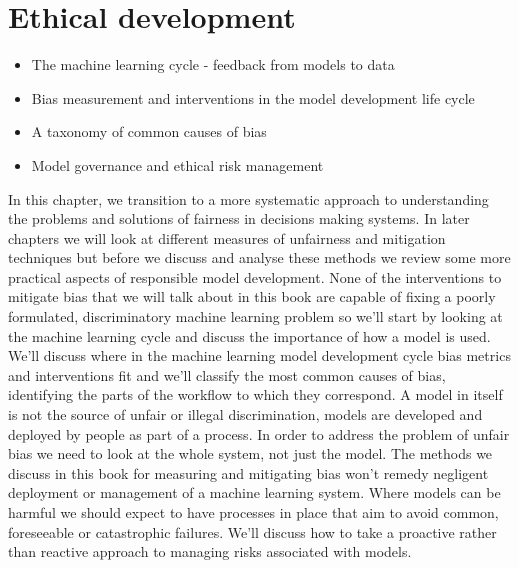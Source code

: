 \chapter{Ethical development}\label{ch_EthicalDev}

\begin{chapsumm}
\begin{itemize}
\item The machine learning cycle - feedback from models to data
\item Bias measurement and interventions in the model development life cycle
\item A taxonomy of common causes of bias
\item Model governance and ethical risk management
\end{itemize}
\end{chapsumm}
%
\noindent
%
In this chapter, we transition to a more systematic approach to understanding the problems and solutions of fairness in decisions making systems. In later chapters we will look at different measures of unfairness and mitigation techniques but before we discuss and analyse these methods we review some more practical aspects of responsible model development. None of the interventions to mitigate bias that we will talk about in this book are capable of fixing a poorly formulated, discriminatory  machine learning problem so we'll start by looking at the machine learning cycle and discuss the importance of how a model is used. We'll discuss where in the machine learning model development cycle bias metrics and interventions fit and we'll classify the most common causes of bias, identifying the parts of the workflow to which they correspond. A model in itself is not the source of unfair or illegal discrimination, models are developed and deployed by people as part of a process. In order to address the problem of unfair bias we need to look at the whole system, not just the model. The methods we discuss in this book for measuring and mitigating bias won't remedy negligent deployment or management of a machine learning system. Where models can be harmful we should expect to have processes in place that aim to avoid common, foreseeable or catastrophic failures. We'll discuss how to take a proactive rather than reactive approach to managing risks associated with models.


